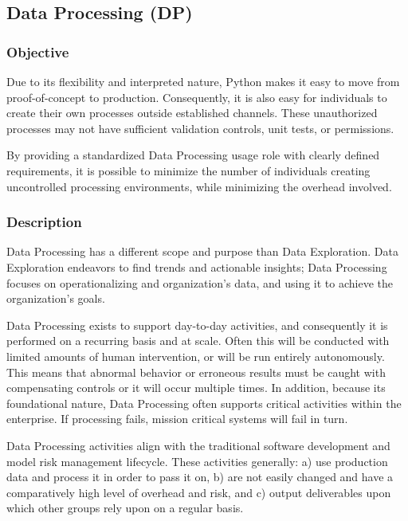 
	\subsection{Data Processing (DP)}

		\subsubsection{Objective}

			Due to its flexibility and interpreted nature, Python makes it easy to move from proof-of-concept to production. Consequently, it is also easy for individuals to create their own processes outside established channels. These unauthorized processes may not have sufficient validation controls, unit tests, or permissions.

			By providing a standardized Data Processing usage role with clearly defined requirements, it is possible to minimize the number of individuals creating uncontrolled processing environments, while minimizing the overhead involved.

		\subsubsection{Description}

			Data Processing has a different scope and purpose than Data Exploration. Data Exploration endeavors to find trends and actionable insights; Data Processing focuses on operationalizing and organization's data, and using it to achieve the organization's goals.

			Data Processing exists to support day-to-day activities, and consequently it is performed on a recurring basis and at scale. Often this will be conducted with limited amounts of human intervention, or will be run entirely autonomously. This means that abnormal behavior or erroneous results must be caught with compensating controls or it will occur multiple times. In addition, because its foundational nature, Data Processing often supports critical activities within the enterprise. If processing fails, mission critical systems will fail in turn.

			Data Processing activities align with the traditional software development and model risk management lifecycle. These activities generally: a) use production data and process it in order to pass it on, b) are not easily changed and have a comparatively high level of overhead and risk, and c) output deliverables upon which other groups rely upon on a regular basis.

